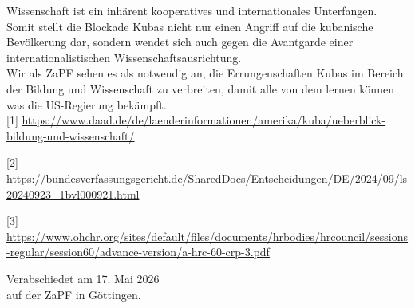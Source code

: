 \documentclass[DIV=calc]{scrartcl}
\begin{document}
Wissenschaft ist ein inhärent kooperatives und internationales Unterfangen. Somit stellt die Blockade Kubas nicht nur einen Angriff auf die kubanische Bevölkerung dar, sondern wendet sich auch gegen die Avantgarde einer internationalistischen Wissenschaftsausrichtung.\\

Wir als ZaPF sehen es als notwendig an, die Errungenschaften Kubas im Bereich der Bildung und Wissenschaft zu verbreiten, damit alle von dem lernen können was die US-Regierung bekämpft.\\

[1] \url{https://www.daad.de/de/laenderinformationen/amerika/kuba/ueberblick-bildung-und-wissenschaft/}

[2] \url{https://bundesverfassungsgericht.de/SharedDocs/Entscheidungen/DE/2024/09/ls20240923_1bvl000921.html}

[3] \url{https://www.ohchr.org/sites/default/files/documents/hrbodies/hrcouncil/sessions-regular/session60/advance-version/a-hrc-60-crp-3.pdf}


\vspace{1cm} 
%
\vfill
\begin{flushright}
	Verabschiedet am 17. Mai 2026 \\
	auf der ZaPF in Göttingen.
\end{flushright}
\end{document}
